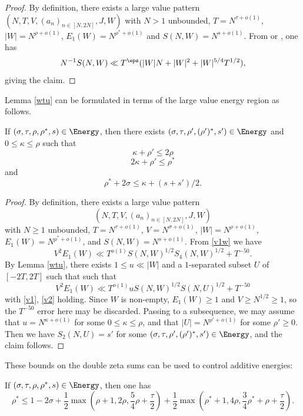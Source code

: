 \literature
{}

\begin{proof} By definition, there exists a large value pattern $(N,T,V,(a_n)_{n \in [N,2N]},J,W)$ with $N>1$ unbounded, $T = N^{\tau+o(1)}$, $|W| = N^{\rho+o(1)}$, $E_1(W) = N^{\rho^*+o(1)}$ and $S(N,W) = N^{s+o(1)}$.   From \cite[Theorem 1]{heathbrown_large_1979} or \cite[Lemma 11.5]{ivic}, one has
$$ N^{-1} S(N,W) \ll T^\eps ( |W| N + |W|^2 + |W|^{5/4} T^{1/2} ),$$
giving the claim.
\end{proof}

Lemma \ref{wtu} can be formulated in terms of the large value energy region as follows.

\begin{lemma}\label{wtu-alt}  If $(\sigma,\tau,\rho,\rho^*,s) \in \Energy$, then there exists $(\sigma,\tau,\rho',(\rho')^*,s') \in \Energy$ and $0 \leq \kappa \leq \rho$ such that
$$ \kappa + \rho' \leq 2 \rho$$
$$ 2\kappa + \rho' \leq \rho^*$$
and
$$ \rho^* + 2\sigma \leq \kappa + (s+s')/2.$$
\end{lemma}


\begin{proof}  By definition, there exists a large value pattern $$(N,T,V,(a_n)_{n \in [N,2N]},J,W)$$ with $N \geq 1$ unbounded, $T = N^{\tau+o(1)}$, $V = N^{\sigma+o(1)}$, $|W| = N^{\rho+o(1)}$, $E_1(W) = N^{\rho^*+o(1)}$, and $S(N,W) = N^{s+o(1)}$. From \eqref{v1w} we have
$$
    V^2 E_1(W) \ll T^{o(1)} S(N,W)^{1/2} S_4(N,W)^{1/2} + T^{-50}.
$$
By Lemma \ref{wtu}, there exists $1 \leq u \ll |W|$ and a $1$-separated subset $U$ of $[-2T,2T]$ such that
 such that
$$
    V^2 E_1(W) \ll T^{o(1)} u S(N,W)^{1/2} S(N,U)^{1/2} + T^{-50}
$$
with \eqref{v1}, \eqref{v2} holding.  Since $W$ is non-empty, $E_1(W) \geq 1$ and $V \geq N^{1/2} \geq 1$, so the $T^{-50}$ error here may be discarded.  Passing to a subsequence, we may assume that $u = N^{\kappa+o(1)}$ for some $0 \leq \kappa \leq \rho$, and that $|U| = N^{\rho'+o(1)}$ for some $\rho' \geq 0$.  Then we have $S_2(N,U) = s'$ for some
$(\sigma,\tau,\rho',(\rho')^*,s') \in \Energy$, and the claim follows.
\end{proof}

These bounds on the double zeta sums can be used to control additive energies:

\begin{theorem}\label{hbt}\cite[(33)]{heathbrown_zero_1979} If $(\sigma,\tau,\rho,\rho^*,s) \in \Energy$, then one has
$$ \rho^* \leq 1-2\sigma + \frac{1}{2}\max\left(\rho+1, 2\rho, \frac{5}{4}\rho+\frac{\tau}{2}\right) + \frac{1}{2}\max\left(\rho^*+1, 4\rho, \frac{3}{4}\rho^*+\rho+\frac{\tau}{2}\right).$$
\end{theorem}

